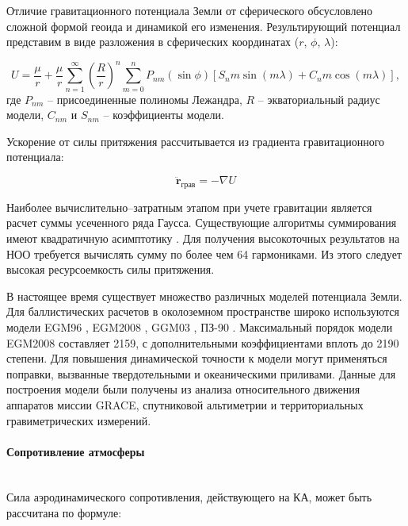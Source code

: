 Отличие гравитационного потенциала Земли от сферического обсусловлено 
сложной формой геоида и динамикой его изменения. Результирующий потенциал представим в виде разложения
в сферических координатах ($r$, $\phi$, $\lambda$):

\begin{equation*}
    U = \frac{\mu}{r} + 
    \frac{\mu}{r} \sum_{n=1}^{\infty} \left(\frac{R}{r}\right)^n 
    \sum_{m=0}^{n} P_{nm}(\sin\phi) \left[ S_nm \sin(m \lambda) + C_nm \cos(m \lambda) \right],
\end{equation*}
где $P_{nm}$ -- присоединенные полиномы Лежандра, $R$ -- экваториальный радиус модели, 
$C_{nm}$ и $S_{nm}$ -- коэффициенты модели.

Ускорение от силы притяжения рассчитывается из градиента гравитационного потенциала:

\begin{equation*}
    \ddot{\mathbf{r}}_{\text{грав}} = -\nabla U
\end{equation*}

Наиболее вычислительно--затратным этапом при учете гравитации является расчет суммы
усеченного ряда Гаусса. Существующие алгоритмы суммирования имеют квадратичную асимптотику
\cite{Clenshaw1955}.
Для получения высокоточных результатов на НОО требуется вычислять сумму по более чем 64 гармониками.
Из этого следует высокая ресурсоемкость силы притяжения.

В настоящее время существует множество различных моделей потенциала Земли.
Для баллистических расчетов в околоземном пространстве широко используются модели EGM96
\cite{Lemoine1998}, EGM2008 \cite{pavlis2012},
GGM03 \cite{Tapley2002-fj}, ПЗ-90 \cite{Galazin1998}.
Максимальный порядок модели EGM2008 составляет 2159, с дополнительными коэффициентами вплоть до 2190 степени.
Для повышения динамической точности к модели могут применяться поправки, вызванные
твердотельными и океаническими приливами. Данные для построения модели были получены из
анализа относительного движения аппаратов миссии GRACE, спутниковой альтиметрии и 
территориальных гравиметрических измерений. 

\paragraph{Сопротивление атмосферы} \mbox{} \\

Сила аэродинамического сопротивления, действующего на КА, может быть рассчитана по формуле:


